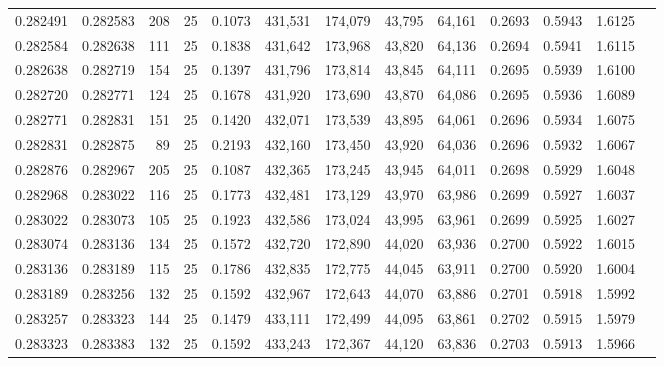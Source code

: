 \begin{tabular}{rrrrrrrrrrrrr}
0.282491 & 0.282583 &   208 &  25 &                                     0.1073 & 431,531 & 174,079 &  43,795 &  64,161 & 0.2693 & 0.5943 & 1.6125 \\
0.282584 & 0.282638 &   111 &  25 &                                     0.1838 & 431,642 & 173,968 &  43,820 &  64,136 & 0.2694 & 0.5941 & 1.6115 \\
0.282638 & 0.282719 &   154 &  25 &                                     0.1397 & 431,796 & 173,814 &  43,845 &  64,111 & 0.2695 & 0.5939 & 1.6100 \\
0.282720 & 0.282771 &   124 &  25 &                                     0.1678 & 431,920 & 173,690 &  43,870 &  64,086 & 0.2695 & 0.5936 & 1.6089 \\
0.282771 & 0.282831 &   151 &  25 &                                     0.1420 & 432,071 & 173,539 &  43,895 &  64,061 & 0.2696 & 0.5934 & 1.6075 \\
0.282831 & 0.282875 &    89 &  25 &                                     0.2193 & 432,160 & 173,450 &  43,920 &  64,036 & 0.2696 & 0.5932 & 1.6067 \\
0.282876 & 0.282967 &   205 &  25 &                                     0.1087 & 432,365 & 173,245 &  43,945 &  64,011 & 0.2698 & 0.5929 & 1.6048 \\
0.282968 & 0.283022 &   116 &  25 &                                     0.1773 & 432,481 & 173,129 &  43,970 &  63,986 & 0.2699 & 0.5927 & 1.6037 \\
0.283022 & 0.283073 &   105 &  25 &                                     0.1923 & 432,586 & 173,024 &  43,995 &  63,961 & 0.2699 & 0.5925 & 1.6027 \\
0.283074 & 0.283136 &   134 &  25 &                                     0.1572 & 432,720 & 172,890 &  44,020 &  63,936 & 0.2700 & 0.5922 & 1.6015 \\
0.283136 & 0.283189 &   115 &  25 &                                     0.1786 & 432,835 & 172,775 &  44,045 &  63,911 & 0.2700 & 0.5920 & 1.6004 \\
0.283189 & 0.283256 &   132 &  25 &                                     0.1592 & 432,967 & 172,643 &  44,070 &  63,886 & 0.2701 & 0.5918 & 1.5992 \\
0.283257 & 0.283323 &   144 &  25 &                                     0.1479 & 433,111 & 172,499 &  44,095 &  63,861 & 0.2702 & 0.5915 & 1.5979 \\
0.283323 & 0.283383 &   132 &  25 &                                     0.1592 & 433,243 & 172,367 &  44,120 &  63,836 & 0.2703 & 0.5913 & 1.5966 \\

\end{tabular}
